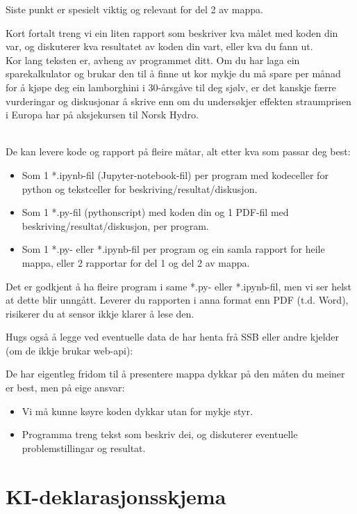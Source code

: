 \documentclass[12pt, titlepage]{article}
\begin{document}
Siste punkt er spesielt viktig og relevant for del 2 av mappa.

Kort fortalt treng vi ein liten rapport som beskriver kva målet med koden din var, og diskuterer kva resultatet av koden din vart, eller kva du fann ut.\\
Kor lang teksten er, avheng av programmet ditt.
Om du har laga ein sparekalkulator og brukar den til å finne ut kor mykje du må spare per månad for å kjøpe deg ein lamborghini i 30-årsgåve til deg sjølv, er det kanskje færre vurderingar og diskusjonar å skrive enn om du undersøkjer effekten straumprisen i Europa har på aksjekursen til Norsk Hydro.

~\\
De kan levere kode og rapport på fleire måtar, alt etter kva som passar deg best:
\begin{itemize}
   \item {Som 1 *.ipynb-fil (Jupyter-notebook-fil) per program med kodeceller for python og tekstceller for beskriving/resultat/diskusjon.}
   \item {Som 1 *.py-fil (pythonscript) med koden din og 1 PDF-fil med beskriving/resultat/diskusjon, per program.}
   \item {Som 1 *.py- eller *.ipynb-fil per program og ein samla rapport for heile mappa, eller 2 rapportar for del 1 og del 2 av mappa.}
\end{itemize}

Det er godkjent å ha fleire program i same *.py- eller *.ipynb-fil, men vi ser helst at dette blir unngått.
Leverer du rapporten i anna format enn PDF (t.d. Word), risikerer du at sensor ikkje klarer å lese den.

Hugs også å legge ved eventuelle data de har henta frå SSB eller andre kjelder (om de ikkje brukar web-api):

De har eigentleg fridom til å presentere mappa dykkar på den måten du meiner er best, men på eige ansvar:
\begin{itemize}
   \item {Vi må kunne køyre koden dykkar utan for mykje styr.}
   \item {Programma treng tekst som beskriv dei, og diskuterer eventuelle problemstillingar og resultat.}
\end{itemize}

\section*{KI-deklarasjonsskjema}
\end{document}
